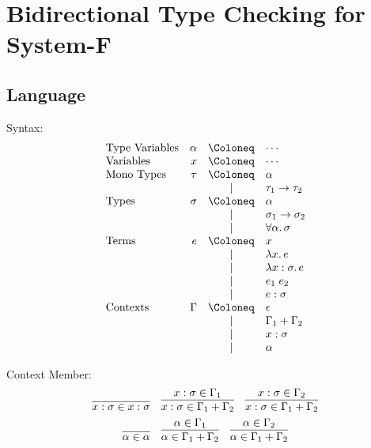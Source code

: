 \section{Bidirectional Type Checking for System-F}

\cite{Dunfield:2013}\cite{Jones:2007}

\subsection{Language}

Syntax:
\begin{align*}
  \begin{array}{lrcl}
    \text{Type Variables} &\alpha&\Coloneq &\cdots \\
    \text{Variables} &x&\Coloneq &\cdots \\
    \text{Mono Types}
    &\tau &\Coloneq &\alpha \\
    &&\mid &\tau_1 \to \tau_2 \\
    \text{Types}
    &\sigma &\Coloneq &\alpha \\
    &&\mid &\sigma_1 \to \sigma_2 \\
    &&\mid &\forall \alpha\ldotp \sigma \\
    \text{Terms}
    &e &\Coloneq &x \\
    &&\mid &\lambda x\ldotp e \\
    &&\mid &\lambda x: \sigma\ldotp e \\
    &&\mid &e_1\; e_2 \\
    &&\mid &e: \sigma \\
    \text{Contexts}
    &\Gamma &\Coloneq &\epsilon \\
    &&\mid &\Gamma_1 + \Gamma_2 \\
    &&\mid &x: \sigma \\
    &&\mid &\alpha
  \end{array}
\end{align*}

Context Member:
\begin{gather*}
  \infer{
    x: \sigma \in x:\sigma
  }{}
  \hspace{1em}
  \infer{
    x: \sigma \in \Gamma_1 + \Gamma_2
  }{
    x: \sigma \in \Gamma_1
  }
  \hspace{1em}
  \infer{
    x: \sigma \in \Gamma_1 + \Gamma_2
  }{
    x: \sigma \in \Gamma_2
  }
  \\
  \infer{
    \alpha \in \alpha
  }{}
  \hspace{1em}
  \infer{
    \alpha \in \Gamma_1 + \Gamma_2
  }{
    \alpha \in \Gamma_1
  }
  \hspace{1em}
  \infer{
    \alpha \in \Gamma_1 + \Gamma_2
  }{
    \alpha \in \Gamma_2
  }
\end{gather*}

